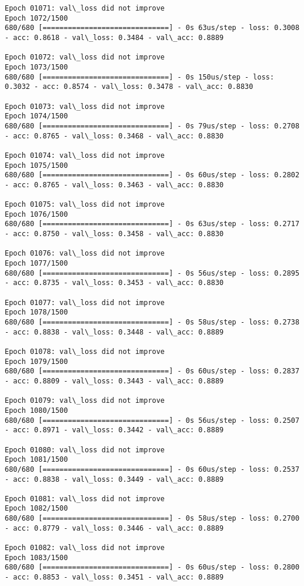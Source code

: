 \documentclass[11pt]{article}
\begin{document}
\begin{Verbatim}[commandchars=\\\{\}]
Epoch 01071: val\_loss did not improve
Epoch 1072/1500
680/680 [==============================] - 0s 63us/step - loss: 0.3008 - acc: 0.8618 - val\_loss: 0.3484 - val\_acc: 0.8889

Epoch 01072: val\_loss did not improve
Epoch 1073/1500
680/680 [==============================] - 0s 150us/step - loss: 0.3032 - acc: 0.8574 - val\_loss: 0.3478 - val\_acc: 0.8830

Epoch 01073: val\_loss did not improve
Epoch 1074/1500
680/680 [==============================] - 0s 79us/step - loss: 0.2708 - acc: 0.8765 - val\_loss: 0.3468 - val\_acc: 0.8830

Epoch 01074: val\_loss did not improve
Epoch 1075/1500
680/680 [==============================] - 0s 60us/step - loss: 0.2802 - acc: 0.8765 - val\_loss: 0.3463 - val\_acc: 0.8830

Epoch 01075: val\_loss did not improve
Epoch 1076/1500
680/680 [==============================] - 0s 63us/step - loss: 0.2717 - acc: 0.8750 - val\_loss: 0.3458 - val\_acc: 0.8830

Epoch 01076: val\_loss did not improve
Epoch 1077/1500
680/680 [==============================] - 0s 56us/step - loss: 0.2895 - acc: 0.8735 - val\_loss: 0.3453 - val\_acc: 0.8830

Epoch 01077: val\_loss did not improve
Epoch 1078/1500
680/680 [==============================] - 0s 58us/step - loss: 0.2738 - acc: 0.8838 - val\_loss: 0.3448 - val\_acc: 0.8889

Epoch 01078: val\_loss did not improve
Epoch 1079/1500
680/680 [==============================] - 0s 60us/step - loss: 0.2837 - acc: 0.8809 - val\_loss: 0.3443 - val\_acc: 0.8889

Epoch 01079: val\_loss did not improve
Epoch 1080/1500
680/680 [==============================] - 0s 56us/step - loss: 0.2507 - acc: 0.8971 - val\_loss: 0.3442 - val\_acc: 0.8889

Epoch 01080: val\_loss did not improve
Epoch 1081/1500
680/680 [==============================] - 0s 60us/step - loss: 0.2537 - acc: 0.8838 - val\_loss: 0.3449 - val\_acc: 0.8889

Epoch 01081: val\_loss did not improve
Epoch 1082/1500
680/680 [==============================] - 0s 58us/step - loss: 0.2700 - acc: 0.8779 - val\_loss: 0.3446 - val\_acc: 0.8889

Epoch 01082: val\_loss did not improve
Epoch 1083/1500
680/680 [==============================] - 0s 60us/step - loss: 0.2800 - acc: 0.8853 - val\_loss: 0.3451 - val\_acc: 0.8889


\end{Verbatim}
\end{document}
